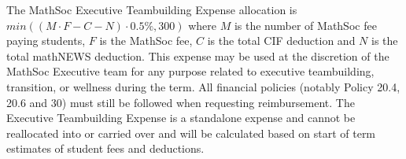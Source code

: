 The MathSoc Executive Teambuilding Expense allocation is $min((M\cdot F - C - N)\cdot 0.5\%, 300)$ where $M$ is the number of MathSoc fee paying students, $F$ is the MathSoc fee, $C$ is the total CIF deduction and $N$ is the total mathNEWS deduction. This expense may be used at the discretion of the MathSoc Executive team for any purpose related to executive teambuilding, transition, or wellness during the term. All financial policies (notably Policy 20.4, 20.6 and 30) must still be followed when requesting reimbursement. The Executive Teambuilding Expense is a standalone expense and cannot be reallocated into or carried over and will be calculated based on start of term estimates of student fees and deductions.
